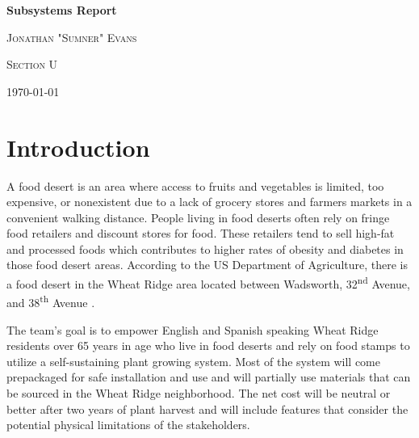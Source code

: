 \documentclass[12pt]{article}
\let\supscr=\textsuperscript
\begin{document}
\begin{titlepage}
    \centering
    \vspace{15cm}
    {\huge\bfseries Subsystems Report \par}
    \vspace{1cm}
    {\scshape\Large Jonathan "Sumner" Evans\par}
    \vfill
    {\scshape\large Section U\par}
    {\large \today\par}
    \vfill
\end{titlepage}

\section{Introduction}
A food desert is an area where access to fruits and vegetables is limited, too expensive, or
nonexistent due to a lack of grocery stores and farmers markets in a convenient walking distance.
\cite{cdc-food-deserts} People living in food deserts often rely on fringe food retailers and
discount stores for food. These retailers tend to sell high-fat and processed foods which
contributes to higher rates of obesity and diabetes in those food desert areas. According to the US
Department of Agriculture, there is a food desert in the Wheat Ridge area located between Wadsworth,
32\supscr{nd} Avenue, and 38\supscr{th} Avenue \cite{usda-food-deserts}.

The team’s goal is to empower English and Spanish speaking Wheat Ridge residents over 65 years in
age who live in food deserts and rely on food stamps to utilize a self-sustaining plant growing
system. Most of the system will come prepackaged for safe installation and use and will partially
use materials that can be sourced in the Wheat Ridge neighborhood. The net cost will be neutral or
better after two years of plant harvest and will include features that consider the potential
physical limitations of the stakeholders.
\end{document}
